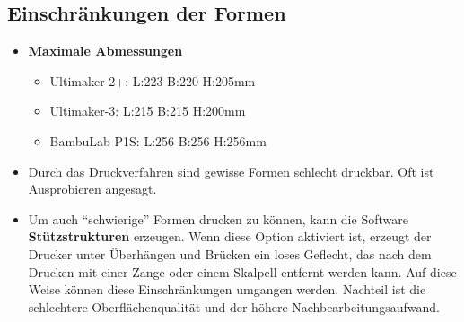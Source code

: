 \documentclass{\basedir/fablab-document}
\begin{document}
\subsection{Einschränkungen der Formen}
\begin{itemize}
\item \textbf{Maximale Abmessungen}
\begin{itemize}
 \item Ultimaker-2+: L:223 B:220 H:205mm
 \item Ultimaker-3: L:215 B:215 H:200mm
 \item BambuLab P1S: L:256 B:256 H:256mm
\end{itemize}
\item Durch das Druckverfahren sind gewisse Formen schlecht druckbar. Oft ist Ausprobieren angesagt.
\item Um auch \enquote{schwierige} Formen drucken zu können, kann die Software \textbf{Stützstrukturen} erzeugen. Wenn diese Option aktiviert ist, erzeugt der Drucker unter Überhängen und Brücken ein loses Geflecht, das nach dem Drucken mit einer Zange oder einem Skalpell entfernt werden kann. Auf diese Weise können diese Einschränkungen umgangen werden. Nachteil ist die schlechtere Oberflächenqualität und der höhere Nachbearbeitungsaufwand.
\end{itemize}
\end{document}
